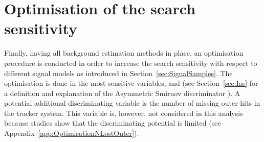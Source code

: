 \FloatBarrier
\chapter{Optimisation of the search sensitivity}
\label{sec:Optimisation}
Finally, having all background estimation methods in place, an optimisation procedure is conducted in order to increase the search sensitivity with respect to different signal models as introduced in Section~\ref{sec:SignalSamples}.
The optimisation is done in the most sensitive variables, \pt and \ias (see Section~\ref{sec:Ias} for a definition and explanation of the Asymmetric Smirnov discriminator \ias).
A potential additional discriminating variable is the number of missing outer hits \nlostouter in the tracker system. 
This variable is, however, not considered in this analysis because studies show that the discriminating potential is limited (see Appendix~\ref{app:OptimisationNLostOuter}).\\

